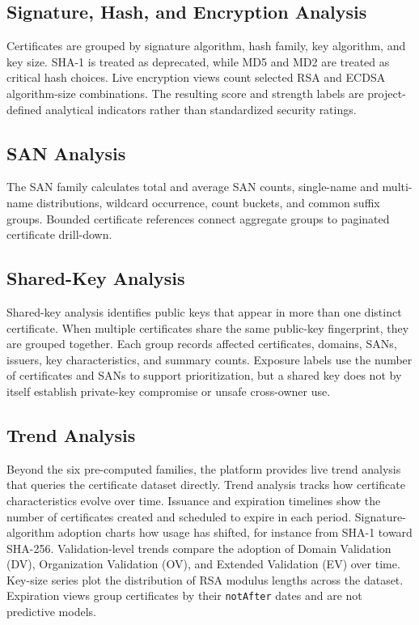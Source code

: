 \subsection{Signature, Hash, and Encryption Analysis}

Certificates are grouped by signature algorithm, hash family, key algorithm,
and key size. SHA-1 is treated as deprecated, while MD5 and MD2 are treated as
critical hash choices. Live encryption views count selected RSA and ECDSA
algorithm-size combinations. The resulting score and strength labels are
project-defined analytical indicators rather than standardized security
ratings.

\subsection{SAN Analysis}

The SAN family calculates total and average SAN counts, single-name and
multi-name distributions, wildcard occurrence, count buckets, and common
suffix groups. Bounded certificate references connect aggregate groups to
paginated certificate drill-down.

\subsection{Shared-Key Analysis}

Shared-key analysis identifies public keys that appear in more than one
distinct certificate. When multiple certificates share the same public-key
fingerprint, they are grouped together. Each group records affected
certificates, domains, SANs, issuers, key characteristics, and summary counts.
Exposure labels use the number of certificates and SANs to support
prioritization, but a shared key does not by itself establish private-key
compromise or unsafe cross-owner use.

\subsection{Trend Analysis}

Beyond the six pre-computed families, the platform provides live trend analysis
that queries the certificate dataset directly. Trend analysis tracks how
certificate characteristics evolve over time.
Issuance and expiration timelines show the number of certificates created and
scheduled to expire in each period. Signature-algorithm adoption charts how
usage has shifted, for instance from SHA-1 toward SHA-256. Validation-level
trends compare the adoption of Domain Validation (DV), Organization Validation
(OV), and Extended Validation (EV) over time. Key-size series plot the
distribution of RSA modulus lengths across the dataset. Expiration views group
certificates by their \texttt{notAfter} dates and are not predictive models.

